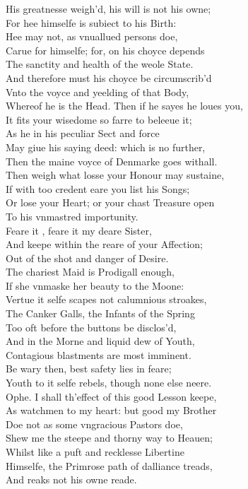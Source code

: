 \documentclass[a5paper,DIV=calc,11pt]{scrbook}
\begin{document}
\begin{drama*}
    His greatnesse weigh'd, his will is not his owne;\\
    For hee himselfe is subiect to his Birth:\\
    Hee may not, as vnuallued persons doe,\\
    Carue for himselfe; for, on his choyce depends\\
    The sanctity and health of the weole State.\\
    And therefore must his choyce be circumscrib'd\\
    Vnto the voyce and yeelding of that Body,\\
    Whereof he is the Head. Then if he sayes he loues you,\\
    It fits your wisedome so farre to beleeue it;\\
    As he in his peculiar Sect and force\\
    May giue his saying deed: which is no further,\\
    Then the maine voyce of Denmarke goes withall.\\
    Then weigh what losse your Honour may sustaine,\\
    If with too credent eare you list his Songs;\\
    Or lose your Heart; or your chast Treasure open\\
    To his vnmastred importunity.\\
    Feare it \ophe, feare it my deare Sister,\\
    And keepe within the reare of your Affection;\\
    Out of the shot and danger of Desire.\\
    The chariest Maid is Prodigall enough,\\
    If she vnmaske her beauty to the Moone:\\
    Vertue it selfe scapes not calumnious stroakes,\\
    The Canker Galls, the Infants of the Spring\\
    Too oft before the buttons be disclos'd,\\
    And in the Morne and liquid dew of Youth,\\
    Contagious blastments are most imminent.\\
    Be wary then, best safety lies in feare;\\
    Youth to it selfe rebels, though none else neere.\\
    Ophe. I shall th'effect of this good Lesson keepe,\\
    As watchmen to my heart: but good my Brother\\
    Doe not as some vngracious Pastors doe,\\
    Shew me the steepe and thorny way to Heauen;\\
    Whilst like a puft and recklesse Libertine\\
    Himselfe, the Primrose path of dalliance treads,\\
    And reaks not his owne reade.
    

\end{drama*}
\end{document}
